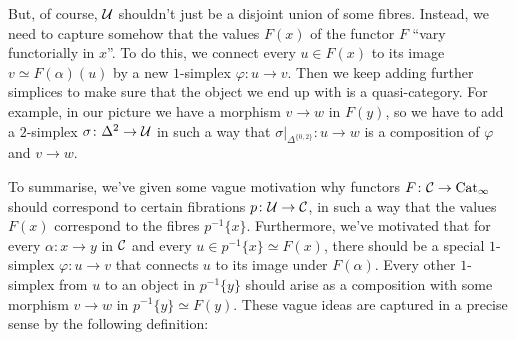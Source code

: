 \begin{numpar}
\begin{center}
\begin{tikzpicture}[line cap=round, line join=round, line width=rule_thickness, decoration={markings,mark=at position 0.5 with {\arrow{to}}},scale=0.95]
		\end{tikzpicture}
	\end{center}
	But, of course, $\Uu$ shouldn't just be a disjoint union of some fibres. Instead, we need to capture somehow that the values $F(x)$ of the functor $F$ \enquote{vary functorially in $x$}. To do this, we connect every $u\in F(x)$ to its image $v\simeq F(\alpha)(u)$ by a new $1$-simplex $\varphi\colon u\rightarrow v$. Then we keep adding further simplices to make sure that the object we end up with is a quasi-category. For example, in our picture we have a morphism $v\rightarrow w$ in $F(y)$, so we have to add a $2$-simplex $\sigma\colon \Delta^2\rightarrow \Uu$ in such a way that $\sigma|_{\Delta^{\{0,2\}}}\colon u\rightarrow w$ is a composition of $\varphi$ and $v\rightarrow w$.
	
	To summarise, we've given some vague motivation why functors $F\colon \Cc\rightarrow\cat{Cat}_\infty$ should correspond to certain fibrations $p\colon \Uu\rightarrow \Cc$, in such a way that the values $F(x)$ correspond to the fibres $p^{-1}\{x\}$. Furthermore, we've motivated that for every $\alpha\colon x\rightarrow y$ in $\Cc$ and every $u\in p^{-1}\{x\}\simeq F(x)$, there should be a special $1$-simplex $\varphi\colon u\rightarrow v$ that connects $u$ to its image under $F(\alpha)$. Every other $1$-simplex from $u$ to an object in $p^{-1}\{y\}$ should arise as a composition with some morphism $v\rightarrow w$ in $p^{-1}\{y\}\simeq F(y)$. These vague ideas are captured in a precise sense by the following definition:
\end{numpar}
